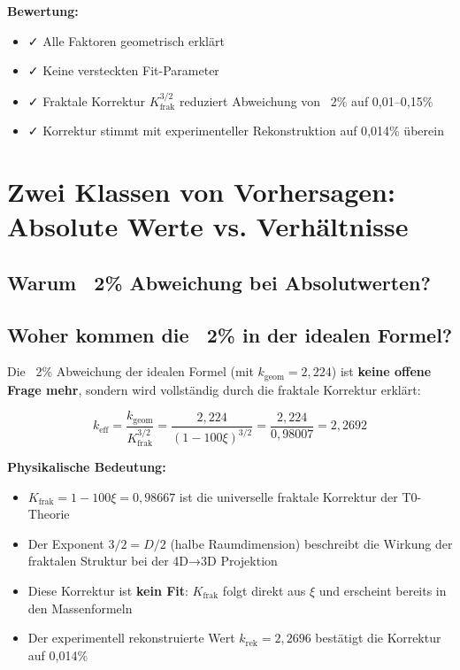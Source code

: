 	\textbf{Bewertung:}
	\begin{itemize}
		\item ✓ Alle Faktoren geometrisch erklärt
		\item ✓ Keine versteckten Fit-Parameter
		\item ✓ Fraktale Korrektur $K_\text{frak}^{3/2}$ reduziert Abweichung von ~2\% auf 0{,}01--0{,}15\%
		\item ✓ Korrektur stimmt mit experimenteller Rekonstruktion auf 0{,}014\% überein
	\end{itemize}
	\section{Zwei Klassen von Vorhersagen: Absolute Werte vs. Verhältnisse}
	
	\subsection{Warum ~2\% Abweichung bei Absolutwerten?}
	
	\subsection{Woher kommen die ~2\% in der idealen Formel?}
	
	Die ~2\% Abweichung der idealen Formel (mit $k_\text{geom} = 2{,}224$) ist \textbf{keine offene Frage mehr}, sondern wird vollständig durch die fraktale Korrektur erklärt:
	
	\begin{equation}
		k_\text{eff} = \frac{k_\text{geom}}{K_\text{frak}^{3/2}} = \frac{2{,}224}{(1-100\xi)^{3/2}} = \frac{2{,}224}{0{,}98007} = 2{,}2692
	\end{equation}
	
	\textbf{Physikalische Bedeutung:}
	\begin{itemize}
		\item $K_\text{frak} = 1 - 100\xi = 0{,}98667$ ist die universelle fraktale Korrektur der T0-Theorie
		\item Der Exponent $3/2 = D/2$ (halbe Raumdimension) beschreibt die Wirkung der fraktalen Struktur bei der 4D→3D Projektion
		\item Diese Korrektur ist \textbf{kein Fit}: $K_\text{frak}$ folgt direkt aus $\xi$ und erscheint bereits in den Massenformeln
		\item Der experimentell rekonstruierte Wert $k_\text{rek} = 2{,}2696$ bestätigt die Korrektur auf 0{,}014\%
	\end{itemize}
	
